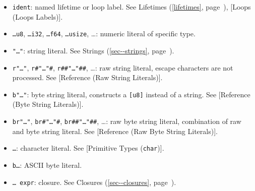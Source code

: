 \documentclass[a4paper,]{book}
\renewcommand*{\hyperlink}[2]{%
 #2 (\autoref{#1}, page~\pageref{#1})}
\providecommand{\tightlist}{%
  \setlength{\itemsep}{0pt}\setlength{\parskip}{0pt}}
\begin{document}
\begin{itemize}
\tightlist
\item
  \texttt{\textquotesingle{}ident}: named lifetime or loop label. See
  \protect\hyperlink{lifetimes}{Lifetimes}, {[}Loops (Loops Labels){]}.
\item
  \texttt{\ldots{}u8}, \texttt{\ldots{}i32}, \texttt{\ldots{}f64},
  \texttt{\ldots{}usize}, \ldots{}: numeric literal of specific type.
\item
  \texttt{"\ldots{}"}: string literal. See
  \protect\hyperlink{sec--strings}{Strings}.
\item
  \texttt{r"\ldots{}"}, \texttt{r\#"\ldots{}"\#},
  \texttt{r\#\#"\ldots{}"\#\#}, \ldots{}: raw string literal, escape
  characters are not processed. See {[}Reference (Raw String
  Literals){]}.
\item
  \texttt{b"\ldots{}"}: byte string literal, constructs a
  \texttt{{[}u8{]}} instead of a string. See {[}Reference (Byte String
  Literals){]}.
\item
  \texttt{br"\ldots{}"}, \texttt{br\#"\ldots{}"\#},
  \texttt{br\#\#"\ldots{}"\#\#}, \ldots{}: raw byte string literal,
  combination of raw and byte string literal. See {[}Reference (Raw Byte
  String Literals){]}.
\item
  \texttt{\textquotesingle{}\ldots{}\textquotesingle{}}: character
  literal. See {[}Primitive Types (\texttt{char}){]}.
\item
  \texttt{b\textquotesingle{}\ldots{}\textquotesingle{}}: ASCII byte
  literal.
\item
  \texttt{\textbar{}\ldots{}\textbar{}\ expr}: closure. See
  \protect\hyperlink{sec--closures}{Closures}.
\end{itemize}
\end{document}
